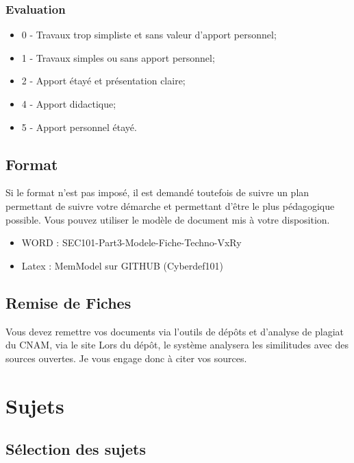 \begin{frame}
\frametitle<presentation>{Evaluation}

\begin{itemize}
  \item 0 - Travaux trop simpliste et sans valeur d'apport personnel;
  \item 1 - Travaux simples ou sans apport personnel;
  \item 2 - Apport étayé et présentation claire;
  \item 4 - Apport didactique;
  \item 5 - Apport personnel étayé.
\end{itemize}
\end{frame}

\subsection{Format}

Si le format n'est pas imposé, il est demandé toutefois de suivre un plan permettant de suivre votre démarche et permettant d'être le plus pédagogique possible.
Vous pouvez utiliser le modèle de document mis à votre disposition.

\begin{itemize}
  \item WORD : SEC101-Part3-Modele-Fiche-Techno-VxRy
  \item Latex :  MemModel sur GITHUB (Cyberdef101)
\end{itemize}

\subsection{Remise de Fiches}

Vous devez remettre vos documents via l'outils de dépôts et d'analyse de plagiat du CNAM, via le site 
Lors du dépôt, le système analysera les similitudes avec des sources ouvertes. Je vous engage donc à citer vos sources.

\section{Sujets}

\subsection{Sélection des sujets}

